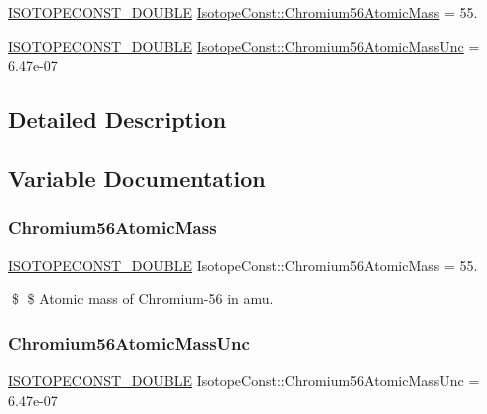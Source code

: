 \begin{DoxyCompactItemize}
\item 
\mbox{\hyperlink{group___isotope_const-_macros_ga8f45a7272ce02c0b4c65c44636ed719a}{I\+S\+O\+T\+O\+P\+E\+C\+O\+N\+S\+T\+\_\+\+D\+O\+U\+B\+LE}} \mbox{\hyperlink{group___isotope_const-_chromium-_cr56_ga916724bf823c3baf193ccaa46f4a4a99}{Isotope\+Const\+::\+Chromium56\+Atomic\+Mass}} = 55.
\item 
\mbox{\hyperlink{group___isotope_const-_macros_ga8f45a7272ce02c0b4c65c44636ed719a}{I\+S\+O\+T\+O\+P\+E\+C\+O\+N\+S\+T\+\_\+\+D\+O\+U\+B\+LE}} \mbox{\hyperlink{group___isotope_const-_chromium-_cr56_ga6290edc2a1ac71da8f802ee8723c69fb}{Isotope\+Const\+::\+Chromium56\+Atomic\+Mass\+Unc}} = 6.\+47e-\/07
\end{DoxyCompactItemize}


\subsection{Detailed Description}


\subsection{Variable Documentation}
\mbox{\label{group___isotope_const-_chromium-_cr56_ga916724bf823c3baf193ccaa46f4a4a99}} 
\subsubsection{\texorpdfstring{Chromium56\+Atomic\+Mass}{Chromium56AtomicMass}}
{\footnotesize\ttfamily \mbox{\hyperlink{group___isotope_const-_macros_ga8f45a7272ce02c0b4c65c44636ed719a}{I\+S\+O\+T\+O\+P\+E\+C\+O\+N\+S\+T\+\_\+\+D\+O\+U\+B\+LE}} Isotope\+Const\+::\+Chromium56\+Atomic\+Mass = 55.}

\$ \$ Atomic mass of Chromium-\/56 in amu. \mbox{\label{group___isotope_const-_chromium-_cr56_ga6290edc2a1ac71da8f802ee8723c69fb}} 
\subsubsection{\texorpdfstring{Chromium56\+Atomic\+Mass\+Unc}{Chromium56AtomicMassUnc}}
{\footnotesize\ttfamily \mbox{\hyperlink{group___isotope_const-_macros_ga8f45a7272ce02c0b4c65c44636ed719a}{I\+S\+O\+T\+O\+P\+E\+C\+O\+N\+S\+T\+\_\+\+D\+O\+U\+B\+LE}} Isotope\+Const\+::\+Chromium56\+Atomic\+Mass\+Unc = 6.\+47e-\/07}


